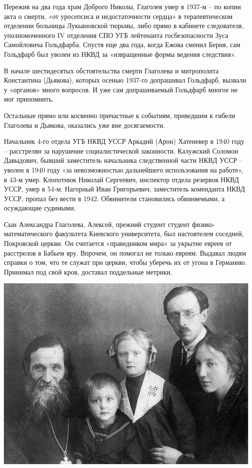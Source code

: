 Пережив на два года храм Доброго Николы, Глаголев умер в 1937-м – по копии акта о смерти, «от уросепсиса и недостаточности сердца» в терапевтическом отделении больницы Лукьяновской тюрьмы, либо прямо в кабинете следователя, уполномоченного IV отделения СПО УГБ лейтенанта госбезопасности Зуса Самойловича Гольдфарба. Спустя еще два года, когда Ежова сменил Берия, сам Гольдфарб был уволен из НКВД за «извращенные формы ведения следствия».

В начале шестидесятых обстоятельства смерти Глаголева и митрополита Константина (Дьякова), которых осенью 1937-го допрашивал Гольдфарб, вызвали у «органов» много вопросов. И уже сам допрашиваемый Гольдфарб многое не мог припомнить. 

Остальные прямо или косвенно причастные к событиям, приведшим к гибели Глаголева и Дьякова, оказались уже вне досягаемости.

Начальник 4-го отдела УГБ НКВД УССР Аркадий (Ар\-он) Хатеневер в 1940 году – расстрелян за нарушение социалистической законности. Калужский Соломон Давыдович, бывший заместитель начальника следственной части НКВД УССР – уволен в 1940 году «за невозможностью дальнейшего использования на работе», в 43-м умер. Клопотнюк Николай Сергеевич, инспектор отдела резервов НКВД УССР, умер в 54-м. Нагорный Иван Григорьевич, заместитель коменданта НКВД УССР, пропал без вести в 1942. Обвинители становились обвиняемыми, а осуждающие судимыми.

Сын Александра Глаголева, Алексей, прежний студент студент физико-математического факультета Киевского университета, был настоятелем соседней, Покровской церкви. Он считается «праведником мира» за укрытие евреев от расстрелов в Бабьем яру. Впрочем, он помогал не только евреям. Выдавал людям справки о том, что те служат при церкви, чтобы уберечь их от угона в Германию. Принимал под свой кров, доставал поддельные метрики.

\begin{center}
\includegraphics[width=\linewidth]{chast-colebanie-osnov/borichev-tok/glagol-01.jpg}
\end{center}

